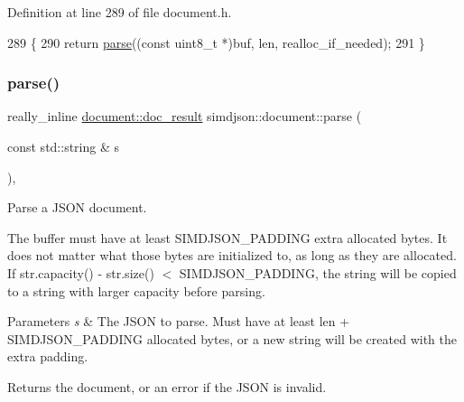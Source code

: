 Definition at line 289 of file document.\+h.


\begin{DoxyCode}
289                                                                                                            
        \{
290     \textcolor{keywordflow}{return} \hyperlink{classsimdjson_1_1document_a6f11cda7c4a06fffdc00fdc97d98ae2b}{parse}((\textcolor{keyword}{const} uint8\_t *)buf, len, realloc\_if\_needed);
291 \}
\end{DoxyCode}
\mbox{\label{classsimdjson_1_1document_a698a6147c2148a7e17d949af3532f145}} 
\subsubsection{\texorpdfstring{parse()}{parse()}\hspace{0.1cm}{\footnotesize\ttfamily [3/4]}}
{\footnotesize\ttfamily really\+\_\+inline \hyperlink{classsimdjson_1_1document_1_1doc__result}{document\+::doc\+\_\+result} simdjson\+::document\+::parse (\begin{DoxyParamCaption}\item[{const std\+::string \&}]{s }\end{DoxyParamCaption})\hspace{0.3cm}{\ttfamily [static]}, {\ttfamily [noexcept]}}



Parse a J\+S\+ON document. 

The buffer must have at least S\+I\+M\+D\+J\+S\+O\+N\+\_\+\+P\+A\+D\+D\+I\+NG extra allocated bytes. It does not matter what those bytes are initialized to, as long as they are allocated. If {\ttfamily str.\+capacity() -\/ str.\+size() $<$ S\+I\+M\+D\+J\+S\+O\+N\+\_\+\+P\+A\+D\+D\+I\+NG}, the string will be copied to a string with larger capacity before parsing.


\begin{DoxyParams}{Parameters}
{\em s} & The J\+S\+ON to parse. Must have at least len + S\+I\+M\+D\+J\+S\+O\+N\+\_\+\+P\+A\+D\+D\+I\+NG allocated bytes, or a new string will be created with the extra padding. \\
\hline
\end{DoxyParams}
\begin{DoxyReturn}{Returns}
the document, or an error if the J\+S\+ON is invalid. 
\end{DoxyReturn}


